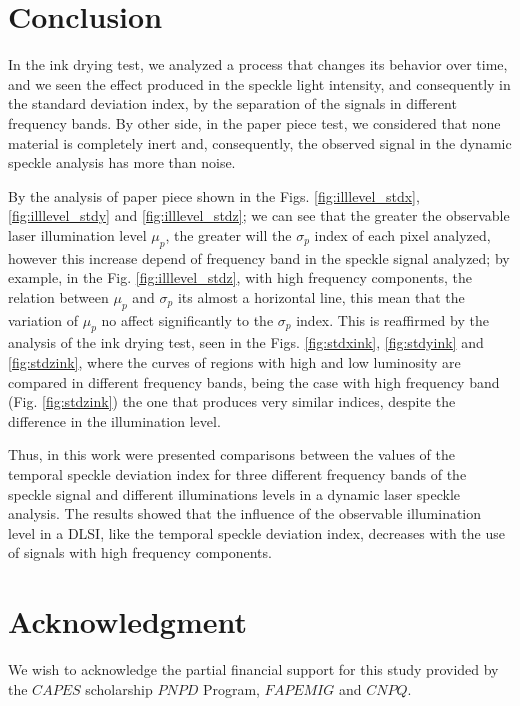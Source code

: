 \documentclass[review]{elsarticle}
\begin{document}
\section{Conclusion} 

In the ink drying test, 
we analyzed a process that changes its behavior over time,
and we seen the effect produced in  the speckle light intensity, 
and consequently in the standard deviation index, 
by the separation of the signals in different frequency bands.
By other side, in the paper piece test, 
we considered that none material is completely inert and, consequently, 
the observed signal  in the  dynamic speckle analysis has more than noise.

By the analysis of paper piece shown in the Figs. \ref{fig:illlevel_stdx}, \ref{fig:illlevel_stdy} and \ref{fig:illlevel_stdz};
we can see that the greater the observable laser illumination level $\mu_p$, 
the greater will the $\sigma_p$ index of each pixel analyzed, 
however this increase depend of frequency band in the speckle signal  analyzed;
by example, in the Fig. \ref{fig:illlevel_stdz},
with high frequency components, the relation between $\mu_p$ and $\sigma_p$ its almost a horizontal line, 
this mean that the variation of $\mu_p$ no affect significantly to the $\sigma_p$ index.
This is reaffirmed by the analysis of the ink drying test, 
seen in the Figs. \ref{fig:stdxink}, \ref{fig:stdyink} and \ref{fig:stdzink},
where the curves of regions with high and low luminosity are compared in different frequency bands,
being the case with high frequency band  (Fig. \ref{fig:stdzink}) 
the one that produces very similar indices, despite the difference in the illumination level.


Thus, in this work were presented comparisons between the values of the temporal 
speckle deviation index for three different frequency bands of the speckle signal and 
different illuminations levels in a dynamic laser speckle analysis. 
The results showed that the influence of the observable illumination level in a DLSI, 
like the temporal speckle deviation index, 
decreases with the use of signals with high frequency components.


\section{Acknowledgment}
We wish to acknowledge the partial financial support for this study provided by the $CAPES$ 
scholarship
$PNPD$ Program, $FAPEMIG$ and $CNPQ$.
\end{document}
